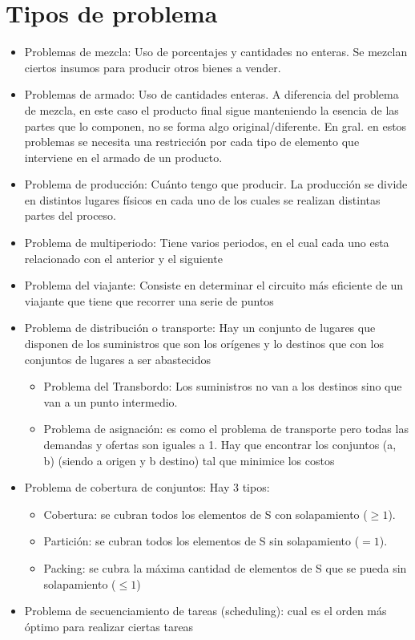 \documentclass[titlepage,a4paper]{article}
\begin{document}
\vspace{0.5cm}

\section{Tipos de problema}

\begin{itemize}
    \item Problemas de mezcla: Uso de porcentajes y cantidades no enteras. Se mezclan ciertos insumos para producir otros bienes a vender.
    \item Problemas de armado: Uso de cantidades enteras. A diferencia del problema de mezcla, en este caso el producto final sigue manteniendo la esencia de las partes que lo componen, no se forma algo original/diferente. En gral. en estos problemas se necesita una restricción por cada tipo de elemento que interviene en el armado de un producto.
    \item Problema de producción: Cuánto tengo que producir. La producción se divide en distintos lugares físicos en cada uno de los cuales se realizan distintas partes del proceso.
    \item Problema de multiperiodo: Tiene varios periodos, en el cual cada uno esta relacionado con el anterior y el siguiente
    \item Problema del viajante: Consiste en determinar el circuito más eficiente de un viajante que tiene que recorrer una serie de puntos
    \item Problema de distribución o transporte: Hay un conjunto de lugares que disponen de los suministros que son los orígenes y lo destinos que con los conjuntos de lugares a ser abastecidos 
    \begin{itemize}
        \item Problema del Transbordo: Los suministros no van a los destinos sino que van a un punto intermedio.
        \item Problema de asignación: es como el problema de transporte pero todas las demandas y ofertas son iguales a 1. Hay que encontrar los conjuntos (a, b) (siendo a origen y b destino) tal que minimice los costos
    \end{itemize}
    \item Problema de cobertura de conjuntos: Hay 3 tipos:
    \begin{itemize}
        \item Cobertura: se cubran todos los elementos de S con solapamiento ($\geq 1$).
        \item Partición: se cubran todos los elementos de S sin solapamiento ($= 1$).
        \item Packing: se cubra la máxima cantidad de elementos de S que se pueda sin solapamiento ($\leq 1$)
    \end{itemize}
    \item Problema de secuenciamiento de tareas (scheduling): cual es el orden más óptimo para realizar ciertas tareas
\end{itemize}
\end{document}
